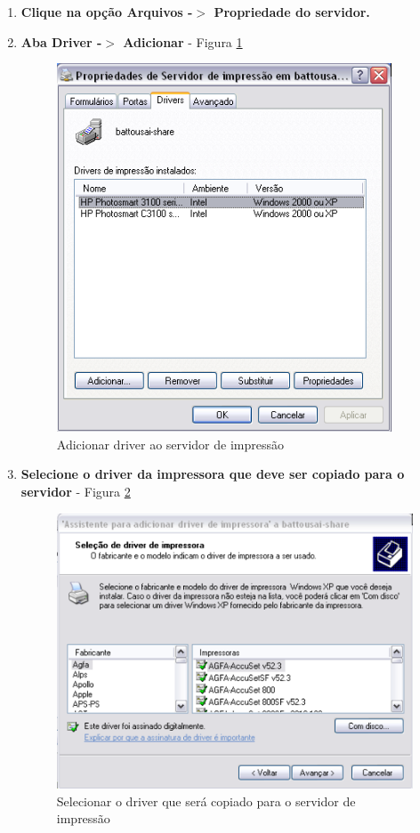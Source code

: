 \begin{enumerate}

	\item \textbf{Clique na opção Arquivos -$>$ Propriedade do servidor.}
	
	
 	\item \textbf{Aba Driver -$>$ Adicionar} - Figura \ref{adicionar_driver}
	\begin{figure}[ht]
	   	\centering
	    \includegraphics[width=0.7 \textwidth]{figuras/adicionar_driver}
	   	\caption{Adicionar driver ao servidor de impressão}
	    \label{adicionar_driver}
	\end{figure}
	
	\pagebreak
	
	\item \textbf{Selecione o driver da impressora que deve ser copiado para o servidor} - Figura \ref{selecionar_driver}
	\begin{figure}[ht]
	   	\centering
	     \includegraphics[width=0.7 \textwidth]{figuras/selecionar_driver}
	   	\caption{Selecionar o driver que será copiado para o servidor de impressão}
	    \label{selecionar_driver}
	\end{figure}
	

\end{enumerate}
